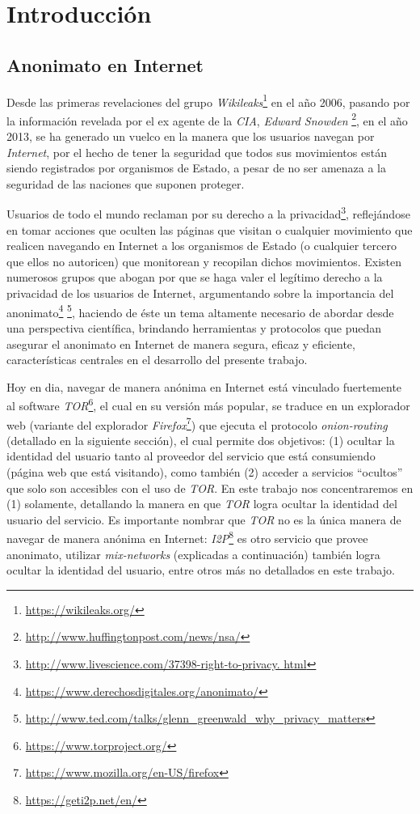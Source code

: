 \chapter{Introducción}
\section{Anonimato en Internet}

Desde las primeras revelaciones del grupo \emph{Wikileaks}\footnote{\url{https://wikileaks.org/}} en el año 2006, 
pasando por la información revelada por el ex agente de la \emph{CIA}, \emph{Edward Snowden}
\footnote{\url{http://www.huffingtonpost.com/news/nsa/}}, en el año 2013, se ha generado un vuelco en la manera que 
los usuarios navegan por \emph{Internet}, por el hecho de tener la seguridad que todos sus movimientos están siendo 
registrados por organismos de Estado, a pesar de no ser amenaza a la seguridad de las naciones que suponen proteger.

Usuarios de todo el mundo reclaman por su derecho a la privacidad\footnote{\url{http://www.livescience.com/37398-right-to-privacy.
html}}, reflejándose en tomar acciones que oculten las páginas que visitan o cualquier movimiento que realicen 
navegando en Internet a los organismos de Estado (o cualquier tercero que ellos no autoricen) que monitorean y recopilan dichos movimientos. Existen numerosos grupos que abogan por que se haga valer el legítimo derecho a la privacidad de los usuarios de Internet, argumentando sobre la importancia del anonimato\footnote{\url{https://www.derechosdigitales.org/anonimato/}} \footnote{\url{http://www.ted.com/talks/glenn_greenwald_why_privacy_matters}}, haciendo de éste un tema altamente necesario de abordar desde una perspectiva científica, brindando herramientas y protocolos que puedan asegurar el anonimato en Internet de manera segura, eficaz y eficiente, características centrales en el desarrollo del presente trabajo.

Hoy en dia, navegar de manera anónima en Internet está vinculado fuertemente al software \emph{TOR}\footnote{\url{https://www.torproject.org/}}, el cual en su versión más popular, se traduce en un explorador web (variante del explorador \emph{Firefox}\footnote{\url{https://www.mozilla.org/en-US/firefox}}) que ejecuta el protocolo \emph{onion-routing} (detallado en la siguiente sección), el cual permite dos objetivos: (1) ocultar la identidad del usuario tanto al proveedor del servicio que está consumiendo (página web que está visitando), como también (2) acceder a servicios ``ocultos'' que solo son accesibles con el uso de \emph{TOR}. En este trabajo nos concentraremos en (1) solamente, detallando la manera en que \emph{TOR} logra ocultar la identidad del usuario del servicio. Es importante nombrar que \emph{TOR} no es la única manera de navegar de manera anónima en Internet: \emph{I2P}\footnote{\url{https://geti2p.net/en/}} es otro servicio que provee anonimato, utilizar \emph{mix-networks} (explicadas a continuación) también logra ocultar la identidad del usuario, entre otros más no detallados en este trabajo.

